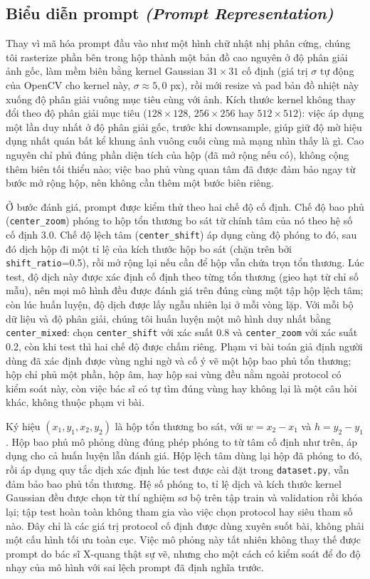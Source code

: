 \documentclass[11pt]{article}
\newcommand{\enlabel}[1]{{\small\itshape\color{gray} (#1)}}
\begin{document}
\subsection{Biểu diễn prompt \enlabel{Prompt Representation}}
\label{sec:prompt-rep}
Thay vì mã hóa prompt đầu vào như một hình chữ nhật nhị phân cứng, chúng tôi rasterize phần bên trong hộp thành một bản đồ cao nguyên ở độ phân giải ảnh gốc, làm mềm biên bằng kernel Gaussian $31\times31$ cố định (giá trị $\sigma$ tự động của OpenCV cho kernel này, $\sigma\approx5,0$ px), rồi mới resize và pad bản đồ nhiệt này xuống độ phân giải vuông mục tiêu cùng với ảnh. Kích thước kernel không thay đổi theo độ phân giải mục tiêu ($128\times128$, $256\times256$ hay $512\times512$): việc áp dụng một lần duy nhất ở độ phân giải gốc, trước khi downsample, giúp giữ độ mờ hiệu dụng nhất quán bất kể khung ảnh vuông cuối cùng mà mạng nhìn thấy là gì. Cao nguyên chỉ phủ đúng phần diện tích của hộp (đã mở rộng nếu có), không cộng thêm biên tối thiểu nào; việc bao phủ vùng quan tâm đã được đảm bảo ngay từ bước mở rộng hộp, nên không cần thêm một bước biên riêng.

Ở bước đánh giá, prompt được kiểm thử theo hai chế độ cố định. Chế độ bao phủ (\texttt{center\_zoom}) phóng to hộp tổn thương bo sát từ chính tâm của nó theo hệ số cố định 3.0. Chế độ lệch tâm (\texttt{center\_shift}) áp dụng cùng độ phóng to đó, sau đó dịch hộp đi một tỉ lệ của kích thước hộp bo sát (chặn trên bởi \texttt{shift\_ratio}=0.5), rồi mở rộng lại nếu cần để hộp vẫn chứa trọn tổn thương. Lúc test, độ dịch này được xác định cố định theo từng tổn thương (gieo hạt từ chỉ số mẫu), nên mọi mô hình đều được đánh giá trên đúng cùng một tập hộp lệch tâm; còn lúc huấn luyện, độ dịch được lấy ngẫu nhiên lại ở mỗi vòng lặp. Với mỗi bộ dữ liệu và độ phân giải, chúng tôi huấn luyện một mô hình duy nhất bằng \texttt{center\_mixed}: chọn \texttt{center\_shift} với xác suất 0.8 và \texttt{center\_zoom} với xác suất 0.2, còn khi test thì hai chế độ được chấm riêng. Phạm vi bài toán giả định người dùng đã xác định được vùng nghi ngờ và cố ý vẽ một hộp bao phủ tổn thương; hộp chỉ phủ một phần, hộp âm, hay hộp sai vùng đều nằm ngoài protocol có kiểm soát này, còn việc bác sĩ có tự tìm đúng vùng hay không lại là một câu hỏi khác, không thuộc phạm vi bài.

Ký hiệu $(x_1,y_1,x_2,y_2)$ là hộp tổn thương bo sát, với $w=x_2-x_1$ và $h=y_2-y_1$. Hộp bao phủ mô phỏng dùng đúng phép phóng to từ tâm cố định như trên, áp dụng cho cả huấn luyện lẫn đánh giá. Hộp lệch tâm dùng lại hộp đã phóng to đó, rồi áp dụng quy tắc dịch xác định lúc test được cài đặt trong \texttt{dataset.py}, vẫn đảm bảo bao phủ tổn thương. Hệ số phóng to, tỉ lệ dịch và kích thước kernel Gaussian đều được chọn từ thí nghiệm sơ bộ trên tập train và validation rồi khóa lại; tập test hoàn toàn không tham gia vào việc chọn protocol hay siêu tham số nào. Đây chỉ là các giá trị protocol cố định được dùng xuyên suốt bài, không phải một cấu hình tối ưu toàn cục. Việc mô phỏng này tất nhiên không thay thế được prompt do bác sĩ X-quang thật sự vẽ, nhưng cho một cách có kiểm soát để đo độ nhạy của mô hình với sai lệch prompt đã định nghĩa trước.
\end{document}
